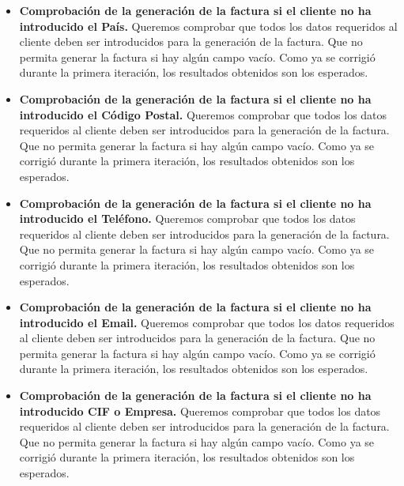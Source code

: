 \begin{itemize}
\begin{itemize}
	\item \textbf{Comprobación de la generación de la factura si el cliente no ha introducido el País.} Queremos comprobar que todos los datos requeridos al cliente deben ser introducidos para la generación de la factura. Que no permita generar la factura si hay algún campo vacío. Como ya se corrigió durante la primera iteración, los resultados obtenidos son los esperados.
	\item \textbf{Comprobación de la generación de la factura si el cliente no ha introducido el Código Postal.} Queremos comprobar que todos los datos requeridos al cliente deben ser introducidos para la generación de la factura. Que no permita generar la factura si hay algún campo vacío. Como ya se corrigió durante la primera iteración, los resultados obtenidos son los esperados.
	\item \textbf{Comprobación de la generación de la factura si el cliente no ha introducido el Teléfono.} Queremos comprobar que todos los datos requeridos al cliente deben ser introducidos para la generación de la factura. Que no permita generar la factura si hay algún campo vacío. Como ya se corrigió durante la primera iteración, los resultados obtenidos son los esperados.
	\item \textbf{Comprobación de la generación de la factura si el cliente no ha introducido el Email.} Queremos comprobar que todos los datos requeridos al cliente deben ser introducidos para la generación de la factura. Que no permita generar la factura si hay algún campo vacío. Como ya se corrigió durante la primera iteración, los resultados obtenidos son los esperados.
	\item \textbf{Comprobación de la generación de la factura si el cliente no ha introducido CIF o Empresa.} Queremos comprobar que todos los datos requeridos al cliente deben ser introducidos para la generación de la factura. Que no permita generar la factura si hay algún campo vacío. Como ya se corrigió durante la primera iteración, los resultados obtenidos son los esperados.
	\end{itemize}			
\end{itemize}

